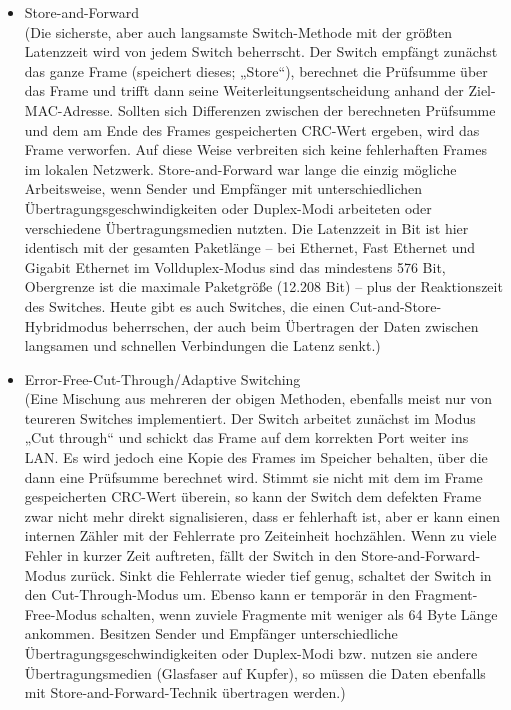 \begin{itemize}
\item Store-and-Forward\\
(Die sicherste, aber auch langsamste Switch-Methode mit der größten Latenzzeit wird von jedem Switch beherrscht. Der Switch empfängt zunächst das ganze Frame (speichert dieses; „Store“), berechnet die Prüfsumme über das Frame und trifft dann seine Weiterleitungsentscheidung anhand der Ziel-MAC-Adresse. Sollten sich Differenzen zwischen der berechneten Prüfsumme und dem am Ende des Frames gespeicherten CRC-Wert ergeben, wird das Frame verworfen. Auf diese Weise verbreiten sich keine fehlerhaften Frames im lokalen Netzwerk. Store-and-Forward war lange die einzig mögliche Arbeitsweise, wenn Sender und Empfänger mit unterschiedlichen Übertragungsgeschwindigkeiten oder Duplex-Modi arbeiteten oder verschiedene Übertragungsmedien nutzten. Die Latenzzeit in Bit ist hier identisch mit der gesamten Paketlänge – bei Ethernet, Fast Ethernet und Gigabit Ethernet im Vollduplex-Modus sind das mindestens 576 Bit, Obergrenze ist die maximale Paketgröße (12.208 Bit) – plus der Reaktionszeit des Switches. Heute gibt es auch Switches, die einen Cut-and-Store-Hybridmodus beherrschen, der auch beim Übertragen der Daten zwischen langsamen und schnellen Verbindungen die Latenz senkt.)

\item Error-Free-Cut-Through/Adaptive Switching\\
(Eine Mischung aus mehreren der obigen Methoden, ebenfalls meist nur von teureren Switches implementiert. Der Switch arbeitet zunächst im Modus „Cut through“ und schickt das Frame auf dem korrekten Port weiter ins LAN. Es wird jedoch eine Kopie des Frames im Speicher behalten, über die dann eine Prüfsumme berechnet wird. Stimmt sie nicht mit dem im Frame gespeicherten CRC-Wert überein, so kann der Switch dem defekten Frame zwar nicht mehr direkt signalisieren, dass er fehlerhaft ist, aber er kann einen internen Zähler mit der Fehlerrate pro Zeiteinheit hochzählen. Wenn zu viele Fehler in kurzer Zeit auftreten, fällt der Switch in den Store-and-Forward-Modus zurück. Sinkt die Fehlerrate wieder tief genug, schaltet der Switch in den Cut-Through-Modus um. Ebenso kann er temporär in den Fragment-Free-Modus schalten, wenn zuviele Fragmente mit weniger als 64 Byte Länge ankommen. Besitzen Sender und Empfänger unterschiedliche Übertragungsgeschwindigkeiten oder Duplex-Modi bzw. nutzen sie andere Übertragungsmedien (Glasfaser auf Kupfer), so müssen die Daten ebenfalls mit Store-and-Forward-Technik übertragen werden.)
\end{itemize}

